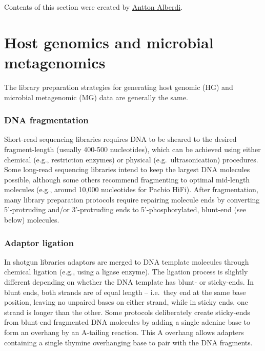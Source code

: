 \documentclass[
]{book}
\begin{document}
Contents of this section were created by \protect\hyperlink{antton-alberdi}{Antton Alberdi}.

\hypertarget{library-meta-genomics}{%
\section{Host genomics and microbial metagenomics}\label{library-meta-genomics}}

The library preparation strategies for generating host genomic (HG) and microbial metagenomic (MG) data are generally the same.

\hypertarget{dna-fragmentation}{%
\subsubsection*{DNA fragmentation}\label{dna-fragmentation}}

Short-read sequencing libraries requires DNA to be sheared to the desired fragment-length (usually 400-500 nucleotides), which can be achieved using either chemical (e.g., restriction enzymes) or physical (e.g.~ultrasonication) procedures. Some long-read sequencing libraries intend to keep the largest DNA molecules possible, although some others recommend fragmenting to optimal mid-length molecules (e.g., around 10,000 nucleotides for Pacbio HiFi). After fragmentation, many library preparation protocols require repairing molecule ends by converting 5'-protruding and/or 3'-protruding ends to 5'-phosphorylated, blunt-end (see below) molecules.

\hypertarget{adaptor-ligation}{%
\subsubsection*{Adaptor ligation}\label{adaptor-ligation}}

In shotgun libraries adaptors are merged to DNA template molecules through chemical ligation (e.g., using a ligase enzyme). The ligation process is slightly different depending on whether the DNA template has blunt- or sticky-ends. In blunt ends, both strands are of equal length -- i.e.~they end at the same base position, leaving no unpaired bases on either strand, while in sticky ends, one strand is longer than the other. Some protocols deliberately create sticky-ends from blunt-end fragmented DNA molecules by adding a single adenine base to form an overhang by an A-tailing reaction. This A overhang allows adapters containing a single thymine overhanging base to pair with the DNA fragments.
\end{document}

